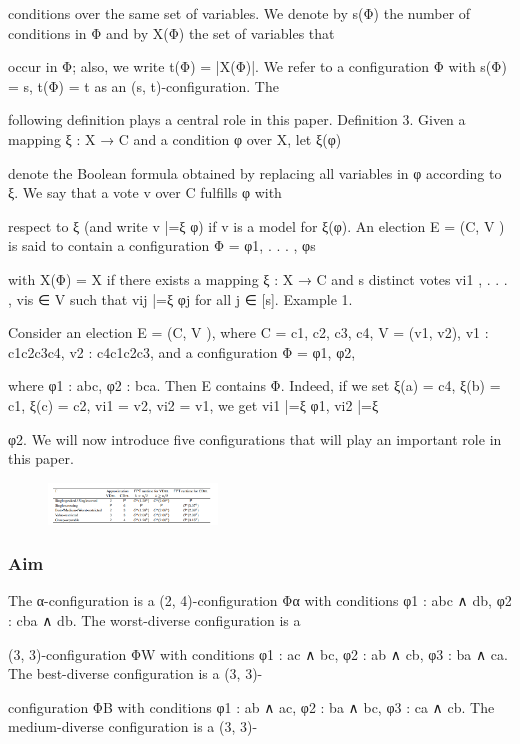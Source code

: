 \documentclass[12pt, a4paper]{report}
\begin{document}
conditions over the same set of variables. We denote by s(Φ) the number of conditions in Φ and by X(Φ) the set of variables that 

occur in Φ; also, we write t(Φ) = |X(Φ)|. We refer to a configuration Φ with s(Φ) = s, t(Φ) = t as an (s, t)-configuration. The 

following definition plays a central role in this paper. Definition 3. Given a mapping ξ : X → C and a condition φ over X, let ξ(φ) 

denote the Boolean formula obtained by replacing all variables in φ according to ξ. We say that a vote v over C fulfills φ with 

respect to ξ (and write v |=ξ φ) if v is a model for ξ(φ). An election E = (C, V ) is said to contain a configuration Φ = {φ1, . . . , φs} 

with X(Φ) = X if there exists a mapping ξ : X → C and s distinct votes vi1 , . . . , vis ∈ V such that vij |=ξ φj for all j ∈ [s]. Example 1. 

Consider an election E = (C, V ), where C = {c1, c2, c3, c4}, V = (v1, v2), v1 : c1c2c3c4, v2 : c4c1c2c3, and a configuration Φ = {φ1, φ2}, 

where φ1 : abc, φ2 : bca. Then E contains Φ. Indeed, if we set ξ(a) = c4, ξ(b) = c1, ξ(c) = c2, vi1 = v2, vi2 = v1, we get vi1 |=ξ φ1, vi2 |=ξ 

φ2. We will now introduce five configurations that will play an important role in this paper.  
\begin{figure}
    \centering
  \includegraphics[width=0.4\textwidth]{configurations.png}
\end{figure}



\subsubsection*{Aim}
 The α-configuration is a (2, 4)-configuration Φα with conditions φ1 : abc ∧ db, φ2 : cba ∧ db. The worst-diverse configuration is a 

(3, 3)-configuration ΦW with conditions φ1 : ac ∧ bc, φ2 : ab ∧ cb, φ3 : ba ∧ ca. The best-diverse configuration is a (3, 3)-

configuration ΦB with conditions φ1 : ab ∧ ac, φ2 : ba ∧ bc, φ3 : ca ∧ cb. The medium-diverse configuration is a (3, 3)-
\end{document}
